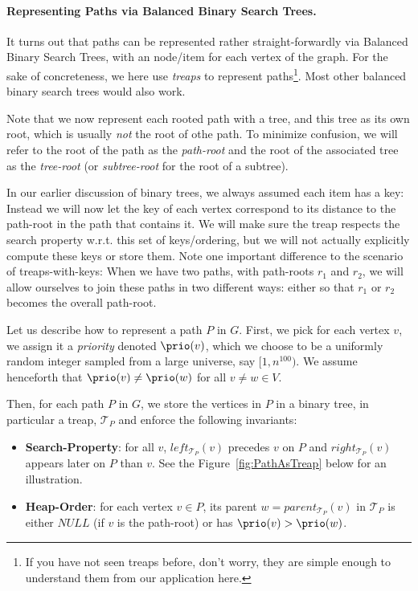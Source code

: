 \paragraph{Representing Paths via Balanced Binary Search Trees.} It turns out that paths can be represented rather straight-forwardly via Balanced Binary Search Trees, with an node/item for each vertex of the graph. For the sake of concreteness, we here use \emph{treaps} to represent paths\footnote{If you have not seen treaps before, don't worry, they are simple enough to understand them from our application here. }.
Most other balanced binary search trees would also work.

Note that we now represent each rooted path with a tree, and this tree as its own root, which is usually \emph{not} the root of othe path. To minimize confusion, we will refer to the root of the path as the \emph{path-root} and the root of the associated tree as the \emph{tree-root} (or \emph{subtree-root} for the root of a subtree).

In our earlier discussion of binary trees, we always assumed each item has a key: Instead we will now let the key of each vertex correspond to its distance to the path-root in the path that contains it.
We will make sure the treap respects the search property w.r.t. this set of keys/ordering, but we will not actually explicitly compute these keys or store them.
Note one important difference to the scenario of treaps-with-keys: When we have two paths, with path-roots $r_1$ and $r_2$, we will allow ourselves to join these paths in two different ways: either so that $r_1$ or $r_2$ becomes the overall path-root.

Let us describe how to represent a path $P$ in $G$. First, we pick for each vertex $v$, we assign it a \emph{priority} denoted $\prio(v)$, which we choose to be a uniformly random integer sampled from a large universe, say $[1, n^{100})$. We assume henceforth that $\prio(v) \neq \prio(w)$ for all $v \neq w \in V$.

Then, for each path $P$ in $G$, we store the vertices in $P$ in a binary tree, in particular a treap, $\mathcal{T}_{P}$ and enforce the following invariants:
\begin{itemize}
      \item \textbf{Search-Property}: for all $v$, $left_{\mathcal{T}_{P}}(v)$ precedes $v$ on $P$ and $right_{\mathcal{T}_{P}}(v)$ appears later on $P$ than $v$. See the Figure~\ref{fig:PathAsTreap} below for an illustration.
    \item \textbf{Heap-Order}: for each vertex $v \in P$, its parent $w = parent_{\mathcal{T}_{P}}(v)$ in $\mathcal{T}_{P}$ is either $NULL$ (if $v$ is the path-root) or has $\prio(v) > \prio(w)$.
\end{itemize}

